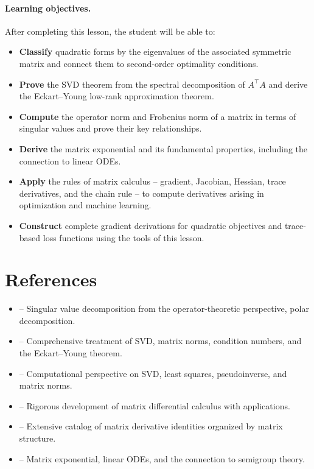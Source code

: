 \documentclass[11pt,a4paper]{article}
\begin{document}
\paragraph{Learning objectives.}
After completing this lesson, the student will be able to:
\begin{itemize}[nosep]
  \item \textbf{Classify} quadratic forms by the eigenvalues of the
        associated symmetric matrix and connect them to second-order
        optimality conditions.
  \item \textbf{Prove} the SVD theorem from the spectral decomposition
        of $A^\top A$ and derive the Eckart--Young low-rank approximation
        theorem.
  \item \textbf{Compute} the operator norm and Frobenius norm of a matrix
        in terms of singular values and prove their key relationships.
  \item \textbf{Derive} the matrix exponential and its fundamental
        properties, including the connection to linear ODEs.
  \item \textbf{Apply} the rules of matrix calculus -- gradient,
        Jacobian, Hessian, trace derivatives, and the chain rule --
        to compute derivatives arising in optimization and machine
        learning.
  \item \textbf{Construct} complete gradient derivations for quadratic
        objectives and trace-based loss functions using the tools of
        this lesson.
\end{itemize}

\section{References}
\label{sec:references}

\begin{itemize}
  \item \citet[Chapter 7]{axler2015} -- Singular value decomposition
        from the operator-theoretic perspective, polar decomposition.
  \item \citet[Sections 3.1--3.3, 7.4]{horn2013} -- Comprehensive
        treatment of SVD, matrix norms, condition numbers, and the
        Eckart--Young theorem.
  \item \citet[Chapters 6--7]{strang2016} -- Computational perspective
        on SVD, least squares, pseudoinverse, and matrix norms.
  \item \citet[Chapters 1--6]{magnus2019} -- Rigorous development of
        matrix differential calculus with applications.
  \item \citet{petersen2012} -- Extensive catalog of matrix derivative
        identities organized by matrix structure.
  \item \citet[Chapter 6]{lax2007} -- Matrix exponential, linear ODEs,
        and the connection to semigroup theory.
\end{itemize}
\end{document}
